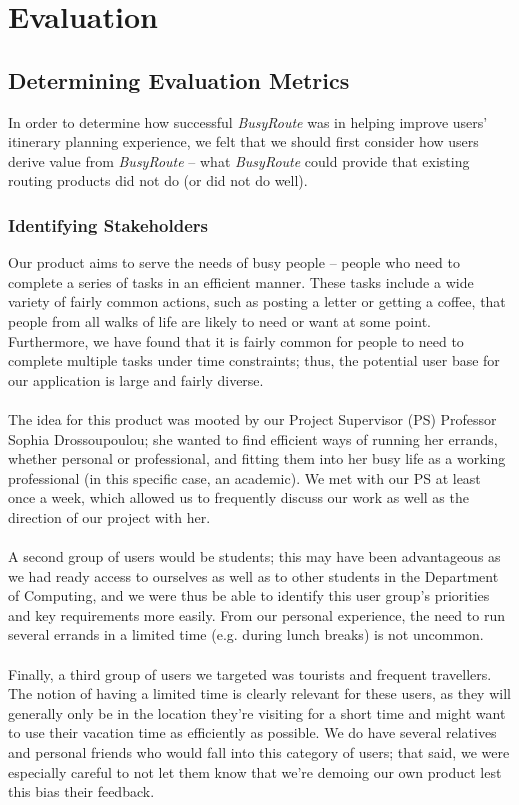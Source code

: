 \documentclass[a4paper, 10pt]{report}
\begin{document}
\chapter{Evaluation}
\section{Determining Evaluation Metrics}
In order to determine how successful \textit{BusyRoute} was in helping improve users' itinerary planning experience, we felt that we should first consider how users derive value from \textit{BusyRoute} -- what \textit{BusyRoute} could provide that existing routing products did not do (or did not do well).
\subsection{Identifying Stakeholders}
Our product aims to serve the needs of busy people -- people who need to complete a series of tasks in an efficient manner. These tasks include a wide variety of fairly common actions, such as posting a letter or getting a coffee, that people from all walks of life are likely to need or want at some point. Furthermore, we have found that it is fairly common for people to need to complete multiple tasks under time constraints; thus, the potential user base for our application is large and fairly diverse.\\\\
The idea for this product was mooted by our Project Supervisor (PS) Professor Sophia Drossoupoulou; she wanted to find efficient ways of running her errands, whether personal or professional, and fitting them into her busy life as a working professional (in this specific case, an academic). We met with our PS at least once a week, which allowed us to frequently discuss our work as well as the direction of our project with her.\\\\
A second group of users would be students; this may have been advantageous as we had ready access to ourselves as well as to other students in the Department of Computing, and we were thus be able to identify this user group's priorities and key requirements more easily.  From our personal experience, the need to run several errands in a limited time (e.g. during lunch breaks) is not uncommon. \\\\
Finally, a third group of users we targeted was tourists and frequent travellers. The notion of having a limited time is clearly relevant for these users, as they will generally only be in the location they're visiting for a short time and might want to use their vacation time as efficiently as possible. We do have several relatives and personal friends who would fall into this category of users; that said, we were especially careful to not let them know that we're demoing our own product lest this bias their feedback.
\end{document}
